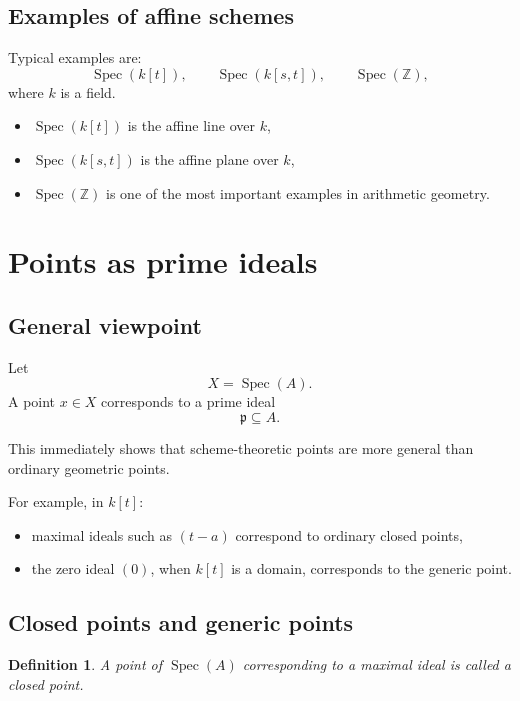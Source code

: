 \documentclass[12pt,a4paper]{article}
\theoremstyle{notespace}
\newtheorem{definition}{Definition}[section]
\newcommand{\Spec}{\operatorname{Spec}}
\newcommand{\Z}{\mathbb Z}
\newcommand{\p}{\mathfrak p}
\theoremstyle{definition}
\begin{document}
	\subsection{Examples of affine schemes}
	
	Typical examples are:
	\[
	\Spec(k[t]),\qquad \Spec(k[s,t]),\qquad \Spec(\Z),
	\]
	where \(k\) is a field.
	
	\begin{itemize}[leftmargin=2em]
		\item \(\Spec(k[t])\) is the affine line over \(k\),
		\item \(\Spec(k[s,t])\) is the affine plane over \(k\),
		\item \(\Spec(\Z)\) is one of the most important examples in arithmetic geometry.
	\end{itemize}
	
	\section{Points as prime ideals}
	
	\subsection{General viewpoint}
	
	Let
	\[
	X=\Spec(A).
	\]
	A point \(x\in X\) corresponds to a prime ideal
	\[
	\p\subseteq A.
	\]
	
	This immediately shows that scheme-theoretic points are more general than ordinary geometric points.
	
	For example, in \(k[t]\):
	
	\begin{itemize}[leftmargin=2em]
		\item maximal ideals such as \((t-a)\) correspond to ordinary closed points,
		\item the zero ideal \((0)\), when \(k[t]\) is a domain, corresponds to the generic point.
	\end{itemize}
	
	\subsection{Closed points and generic points}
	
	\begin{definition}
		A point of \(\Spec(A)\) corresponding to a maximal ideal is called a \emph{closed point}.
	\end{definition}
	
\end{document}
